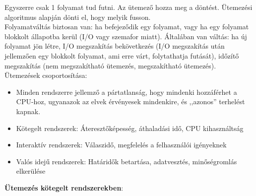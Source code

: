 \documentclass[margin=0px]{article}
\begin{document}
Egyszerre csak 1 folyamat tud futni. Az ütemező hozza meg a döntést. Ütemezési algoritmus alapján dönti el, hogy melyik fusson. \\
Folyamatváltás biztosan van: ha befejeződik egy folyamat, vagy ha egy folyamat blokkolt állapotba kerül (I/O vagy szemafor miatt). Általában van váltás: ha új folyamat jön létre, I/O megszakítás bekövetkezés (I/O megszakítás után jellemzően egy blokkolt folyamat, ami erre várt, folytathatja futását), időzítő megszakítás (nem megszakítható ütemezés, megszakítható ütemezés). \\
Ütemezések csoportosítása:
\begin{itemize}
    \item Minden rendszerre jellemző a pártatlanság, hogy mindenki hozzáférhet a CPU-hoz, ugyanazok az elvek érvényesek mindenkire, és ,,azonos” terhelést kapnak.
    \item Kötegelt rendszerek: Áteresztőképesség, áthaladási idő, CPU kihasználtság
    \item Interaktív rendszerek: Válaszidő, megfelelés a felhasználói igényeknek
    \item Valós idejű rendszerek: Határidők betartása, adatvesztés, minőségromlás
          elkerülése
\end{itemize}
\textbf{Ütemezés kötegelt rendszerekben}:
\end{document}
